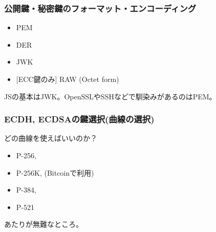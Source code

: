 \documentclass[12pt,dvipdfmx]{beamer}
\newcommand{\backupbegin}{
   \newcounter{framenumberappendix}
   \setcounter{framenumberappendix}{\value{framenumber}}
}
\newcommand{\backupend}{
   \addtocounter{framenumberappendix}{-\value{framenumber}}
   \addtocounter{framenumber}{\value{framenumberappendix}} 
}
\begin{document}
\begin{frame}
\frametitle{公開鍵・秘密鍵のフォーマット・エンコーディング}
\begin{itemize}
 \item PEM
 \item DER
 \item JWK
 \item {[ECC鍵のみ]}  RAW (Octet form)
\end{itemize}
JSの基本はJWK。OpenSSLやSSHなどで馴染みがあるのはPEM。
\end{frame}

\begin{frame}
\frametitle{ECDH, ECDSAの鍵選択(曲線の選択)}
どの曲線を使えばいいのか？
\begin{itemize}
 \item P-256,
 \item P-256K, (Bitcoinで利用)
 \item P-384,
 \item P-521
\end{itemize}
あたりが無難なところ。
\end{frame}







 

\end{document}
